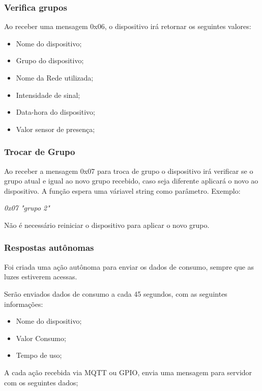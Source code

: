 \documentclass[openright]{normas-utf-tex} %
\begin{document}
\subsubsection{Verifica grupos}

Ao receber uma mensagem 0x06, o dispositivo irá retornar os seguintes valores:

\begin{itemize}
    \item Nome do dispositivo;
    \item Grupo do dispositivo;
    \item Nome da Rede utilizada;
    \item Intensidade de sinal;
    \item Data-hora do dispositivo;
    \item Valor sensor de presença;
\end{itemize}

\subsubsection{Trocar de Grupo}
Ao receber a mensagem 0x07 para troca de grupo o dispositivo irá verificar se o grupo atual e igual ao novo grupo recebido, caso seja diferente aplicará o novo ao dispositivo.
A função espera uma váriavel string\cite{Altabooks} como parâmetro.
Exemplo:
\begin{center}
    \textit{
    0x07 "grupo 2"
    }
\end{center}

Não é necessário reiniciar o dispositivo para aplicar o novo grupo.

\subsubsection{Respostas autônomas}

Foi criada uma ação autônoma para enviar os dados de consumo, sempre que as luzes estiverem acessas. 

Serão enviados dados de consumo a cada 45 segundos, com as seguintes informações:

\begin{itemize}
    \item Nome do dispositivo;
    \item Valor Consumo;
    \item Tempo de uso;
\end{itemize}

A cada ação recebida via MQTT ou GPIO,  envia uma mensagem para servidor com os seguintes dados;
\end{document}
